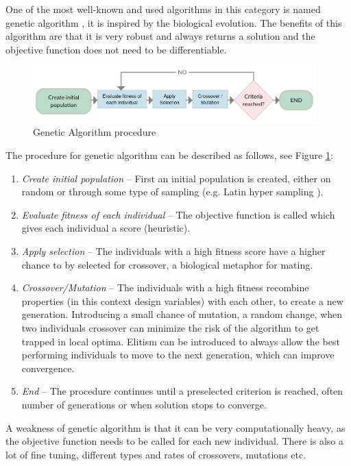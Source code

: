 One of the most well-known and used algorithms in this category is named genetic algorithm \cite{Goldberg1989}, it is inspired by the biological evolution. The benefits of this algorithm are that it is very robust and always returns a solution and the objective function does not need to be differentiable. 

\begin{figure}
  \includegraphics[width=310pt]{graphics/ga.png}
  \caption{Genetic Algorithm procedure}
  \label{fig:ga}
\end{figure}


The procedure for genetic algorithm can be described as follows, see Figure \ref{fig:ga}:

\begin{enumerate} 
\item \textit{Create initial population }– First an initial population is created, either on random or through some type of sampling (e.g. Latin hyper sampling \cite{10.2307/1268522}).
\item \textit{Evaluate fitness of each individual} – The objective function is called which gives each individual a score (heuristic).
\item \textit{Apply selection} – The individuals with a high fitness score have a higher chance to by selected for crossover, a biological metaphor for mating.
\item \textit{Crossover/Mutation} – The individuals with a high fitness recombine properties (in this context design variables) with each other, to create a new generation. Introducing a small chance of mutation, a random change, when two individuals crossover can minimize the risk of the algorithm to get trapped in local optima. Elitism can be introduced to always allow the best performing individuals to move to the next generation, which can improve convergence. 
\item \textit{End} – The procedure continues until a preselected criterion is reached, often number of generations or when solution stops to converge.
\end{enumerate} 


A weakness of genetic algorithm is that it can be very computationally heavy, as the objective function needs to be called for each new individual. There is also a lot of fine tuning, different types and rates of crossovers, mutations etc. 

